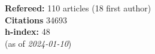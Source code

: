 \textbf{Refereed:} 110 articles (18 first author)\\\textbf{Citations} 34693\\\textbf{h-index:} 48\\(as of \textit{2024-01-10})